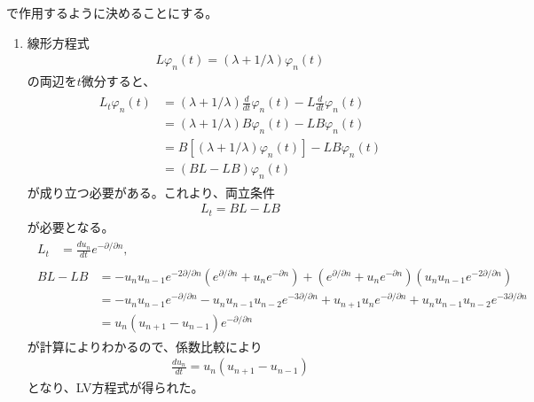 \documentclass{jsarticle}
\begin{document}
で作用するように決めることにする。
\begin{enumerate}
\item 線形方程式
\begin{align}
L\varphi_{n}(t)=(\lambda+1/\lambda)\varphi_{n}(t)
\end{align}
の両辺を$t$微分すると、
\begin{align}
\begin{split}
L_{t}\varphi_{n}(t)
&=(\lambda+1/\lambda)\frac{d}{dt}\varphi_{n}(t)
-L\frac{d}{dt}\varphi_{n}(t)\\
&=(\lambda+1/\lambda)B\varphi_{n}(t)-LB\varphi_{n}(t)\\
&=B\left[(\lambda+1/\lambda)\varphi_{n}(t)\right]-LB\varphi_{n}(t)\\
&=(BL-LB)\varphi_{n}(t)
\end{split}
\end{align}
が成り立つ必要がある。これより、両立条件
\begin{align}
L_{t}=BL-LB
\end{align}
が必要となる。
\begin{align}
\begin{split}
L_{t}&=\frac{du_{n}}{dt}e^{-\partial/\partial n},
\end{split}\\
\begin{split}
BL-LB&=-u_{n}u_{n-1}e^{-2\partial/\partial n}\left(e^{\partial/\partial n}+u_{n}e^{-\partial n}\right)
+\left(e^{\partial/\partial n}+u_{n}e^{-\partial n}\right)\left(u_{n}u_{n-1}e^{-2\partial/\partial n}\right)\\
&=-u_{n}u_{n-1}e^{-\partial/\partial n}-u_{n}u_{n-1}u_{n-2}e^{-3\partial/\partial n}
+u_{n+1}u_{n}e^{-\partial/\partial n}+u_{n}u_{n-1}u_{n-2}e^{-3\partial/\partial n}\\
&=u_{n}(u_{n+1}-u_{n-1})e^{-\partial/\partial n}
\end{split}
\end{align}
が計算によりわかるので、係数比較により
\begin{align}
\frac{du_{n}}{dt}=u_{n}(u_{n+1}-u_{n-1})
\end{align}
となり、LV方程式が得られた。


\end{enumerate}
\end{document}
